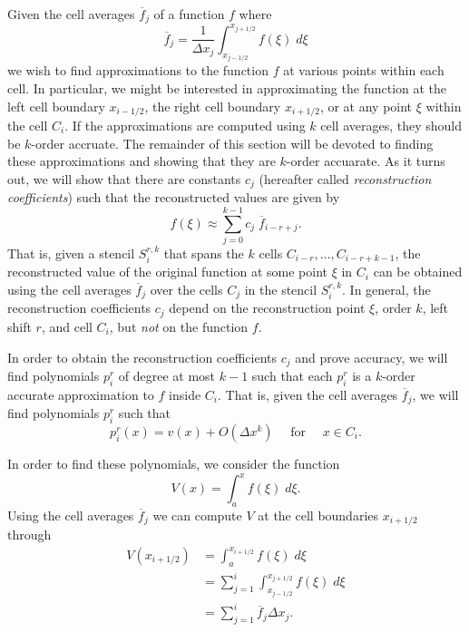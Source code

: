 \documentclass{article}
\newcommand{\for}[0]{\quad \text{ for } \quad}
\newcommand{\xli}[0]{x_{i-1/2}}
\newcommand{\xri}[0]{x_{i+1/2}}
\newcommand{\xlj}[0]{x_{j-1/2}}
\newcommand{\xrj}[0]{x_{j+1/2}}
\numberwithin{equation}{section}
\begin{document}
Given the cell averages $\overline{f}_j$ of a function $f$ where
\begin{equation}
  \overline{f}_j = \frac{1}{\Delta x_j} \int_{\xlj}^{\xrj} f(\xi) \;d\xi
\end{equation}
we wish to find approximations to the function $f$ at various points
within each cell.  In particular, we might be interested in
approximating the function at the left cell boundary $\xli$, the right
cell boundary $\xri$, or at any point $\xi$ within the cell $C_i$.  If
the approximations are computed using $k$ cell averages, they should
be $k$-order accruate.  The remainder of this section will be devoted
to finding these approximations and showing that they are $k$-order
accuarate.  As it turns out, we will show that there are constants
$c_j$ (hereafter called \emph{reconstruction coefficients}) such that
the reconstructed values are given by
\begin{equation*}
  f(\xi) \approx \sum_{j=0}^{k-1} c_j\; \overline{f}_{i-r+j}.
\end{equation*}
That is, given a stencil $S_i^{r,k}$ that spans the $k$ cells
$C_{i-r},\ldots,C_{i-r+k-1}$, the reconstructed value of the original
function at some point $\xi$ in $C_i$ can be obtained using the cell
averages $\overline{f}_{j}$ over the cells $C_j$ in the stencil
$S_i^{r,k}$.  In general, the reconstruction coefficients $c_j$ depend
on the reconstruction point $\xi$, order $k$, left shift $r$, and cell
$C_i$, but \emph{not} on the function $f$.

In order to obtain the reconstruction coefficients $c_j$ and prove
accuracy, we will find polynomials $p^r_i$ of degree at most $k-1$
such that each $p^r_i$ is a $k$-order accurate approximation to $f$
inside $C_i$.  That is, given the cell averages $\overline{f}_j$, we
will find polynomials $p^r_i$ such that
\begin{equation*}
  p^r_i(x) = v(x) + O(\Delta x^k) \for x \in C_i.
\end{equation*}

In order to find these polynomials, we consider the function
\begin{equation}
  \label{eq:V}
  V(x) = \int_a^x f(\xi) \;d\xi.
\end{equation}
Using the cell averages $\overline{f}_j$ we can compute $V$ at the
cell boundaries $\xri$ through
\begin{align}
  V(\xri) &= \int_a^{\xri} f(\xi) \;d\xi \nonumber \\
          &= \sum_{j=1}^i \int_{\xlj}^{\xrj} f(\xi) \;d\xi \nonumber \\
          &= \sum_{j=1}^i \overline{f}_j \Delta x_j.
          \label{eq:Vsum}
\end{align}
\end{document}
